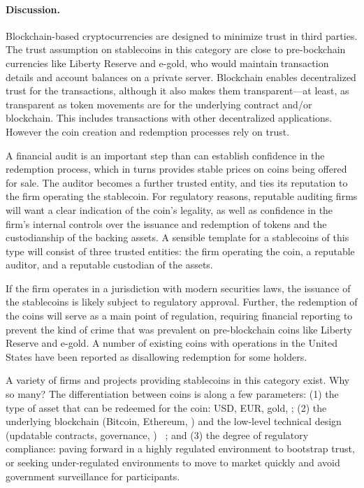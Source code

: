 \paragraph{Discussion.} Blockchain-based cryptocurrencies are designed to minimize trust in third parties. The trust assumption on stablecoins in this category are close to pre-bockchain currencies like Liberty Reserve and e-gold, who would maintain transaction details and account balances on a private server. Blockchain enables decentralized trust for the transactions, although it also makes them transparent---at least, as transparent as token movements are for the underlying contract and/or blockchain. This includes transactions with other decentralized applications. However the coin creation and redemption processes rely on trust.

A financial audit is an important step than can establish confidence in the redemption process, which in turns provides stable prices on coins being offered for sale. The auditor becomes a further trusted entity, and ties its reputation to the firm operating the stablecoin. For regulatory reasons, reputable auditing firms will want a clear indication of the coin's legality, as well as confidence in the firm's internal controls over the issuance and redemption of tokens and the custodianship of the backing assets. A sensible template for a stablecoins of this type will consist of three trusted entities: the firm operating the coin, a reputable auditor, and a reputable custodian of the assets.

If the firm operates in a jurisdiction with modern securities laws, the issuance of the stablecoins is likely subject to regulatory approval. Further, the redemption of the coins will serve as a main point of regulation, requiring financial reporting to prevent the kind of crime that was prevalent on pre-blockchain coins like Liberty Reserve and e-gold. A number of existing coins with operations in the United States have been reported as disallowing redemption for some holders.


A variety of firms and projects providing stablecoins in this category exist. Why so many? The differentiation between coins is along a few parameters: (1) the type of asset that can be redeemed for the coin: USD, EUR, gold, \etc; (2) the underlying blockchain (\eg Bitcoin, Ethereum, \etc) and the low-level technical design (updatable contracts, governance, \etc) ~\cite{geminido29:online}; and (3) the degree of regulatory compliance: paving forward in a highly regulated environment to bootstrap trust, or seeking under-regulated environments to move to market quickly and avoid government surveillance for participants.

